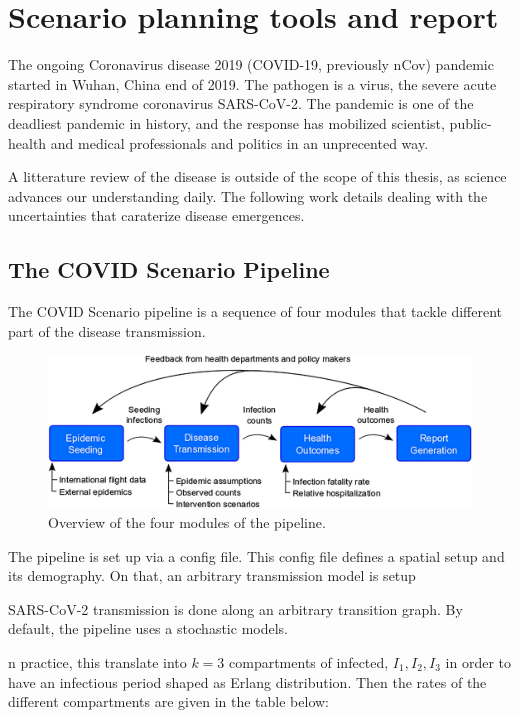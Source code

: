 \chapter{Scenario planning tools and report}
\label{sec:covid-pipeline-reports}

The ongoing Coronavirus disease 2019 (COVID-19, previously nCov) pandemic started in Wuhan, China end of 2019. The pathogen is a virus, the severe acute respiratory syndrome coronavirus SARS-CoV-2. The pandemic is one of the deadliest pandemic in history, and the response has mobilized scientist, public-health and medical professionals and politics in an unprecented way.

A litterature review of the disease is outside of the scope of this thesis, as science advances our understanding daily. The following work details dealing with the uncertainties that caraterize disease emergences.

\section{The COVID Scenario Pipeline}

The COVID Scenario pipeline is a sequence of four modules that tackle different part of the disease transmission.

\begin{figure}[!htb]
    \centering
    \includegraphics[width = .7\textwidth]{fig_pipeline/fig1a}
    \caption[The four modules of the pipeline]{Overview of the four modules of the pipeline.}
    \label{fig:pipeline-modules}
\end{figure}

The pipeline is set up via a config file. This config file defines a spatial setup and its demography. On that, an arbitrary transmission model is setup

SARS-CoV-2 transmission is done along an arbitrary transition graph. By default, the pipeline uses a stochastic models.

n practice, this translate into $k = 3$ compartments of infected, $I_1, I_2, I_3$ in 
order to have an infectious period shaped as Erlang distribution.
Then the rates of the different compartments are given in the table below:

